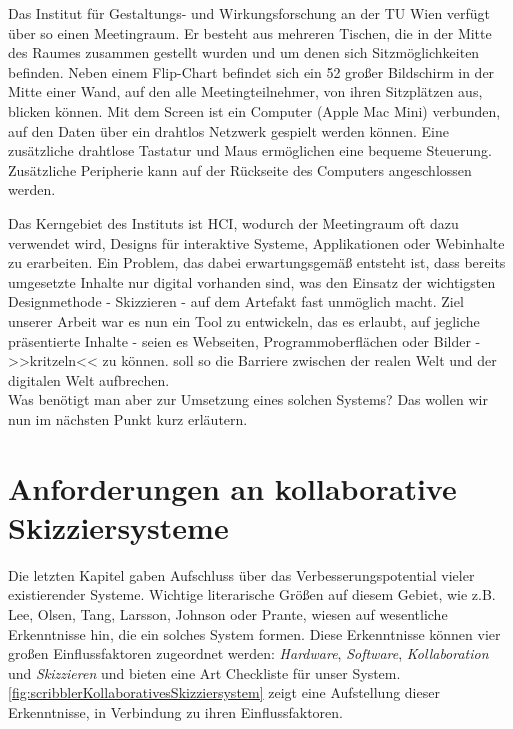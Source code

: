 \medskip Das Institut für Gestaltungs- und Wirkungsforschung an der TU Wien verfügt über so einen Meetingraum. Er besteht aus mehreren Tischen, die in der Mitte des Raumes zusammen gestellt wurden und um denen sich Sitzmöglichkeiten befinden. Neben einem Flip-Chart befindet sich ein {52\dq} großer Bildschirm in der Mitte einer Wand, auf den alle Meetingteilnehmer, von ihren Sitzplätzen aus, blicken können. Mit dem Screen ist ein Computer (Apple Mac Mini) verbunden, auf den Daten über ein drahtlos Netzwerk gespielt werden können. Eine zusätzliche drahtlose Tastatur und Maus ermöglichen eine bequeme Steuerung. Zusätzliche Peripherie kann auf der Rückseite des Computers angeschlossen werden.

\medskip Das Kerngebiet des Instituts ist \ac{HCI}, wodurch der Meetingraum oft dazu verwendet wird, Designs für interaktive Systeme, Applikationen oder Webinhalte zu erarbeiten. Ein Problem, das dabei erwartungsgemäß entsteht ist, dass bereits umgesetzte Inhalte nur digital vorhanden sind, was den Einsatz der wichtigsten Designmethode - Skizzieren - auf dem Artefakt fast unmöglich macht. Ziel unserer Arbeit war es nun ein Tool zu entwickeln, das es erlaubt, auf jegliche präsentierte Inhalte - seien es Webseiten, Programmoberflächen oder Bilder - >>kritzeln<< zu können. \scribbler soll so die Barriere zwischen der realen Welt und der digitalen Welt aufbrechen. \\Was benötigt man aber zur Umsetzung eines solchen Systems? Das wollen wir nun im nächsten Punkt kurz erläutern.

\section{Anforderungen an kollaborative Skizziersysteme} \label{sec:anforderungen}
Die letzten Kapitel gaben Aufschluss über das Verbesserungspotential vieler existierender Systeme. Wichtige literarische Größen auf diesem Gebiet, wie z.B. Lee, Olsen, Tang, Larsson, Johnson oder Prante, wiesen auf wesentliche Erkenntnisse hin, die ein solches System formen. Diese Erkenntnisse können vier großen Einflussfaktoren zugeordnet werden: \emph{Hardware}, \emph{Software}, \emph{Kollaboration} und \emph{Skizzieren} und bieten eine Art Checkliste für unser System. \autoref{fig:scribblerKollaborativesSkizziersystem} zeigt eine Aufstellung dieser Erkenntnisse, in Verbindung zu ihren Einflussfaktoren. 

